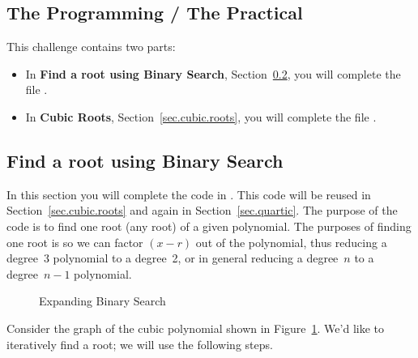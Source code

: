 \subsection{The Programming / The Practical}

This challenge contains two parts:
\begin{itemize}
\item In \textbf{Find a root using Binary Search}, Section~\ref{sec.binary.search}, you will complete the file .
\item In \textbf{Cubic Roots}, Section~\ref{sec.cubic.roots}, you will complete the file .
\end{itemize}

\subsection{Find a root using Binary Search}
\label{sec.binary.search}

In this section you will complete the code in .
This code will be reused in Section~\ref{sec.cubic.roots} and again in
Section~\ref{sec.quartic}.  The purpose of the code is to find one
root (any root) of a given polynomial.  The purposes of finding one
root is so we can factor $(x-r)$ out of the polynomial, thus reducing
a degree~3 polynomial to a degree~2, or in general reducing a degree~$n$ to a degree~$n-1$ polynomial.

\begin{figure}
  \centering

  \caption{Expanding Binary Search} 
  \label{fig.cubic.binary}
\end{figure}

Consider the graph of the cubic polynomial shown in Figure~\ref{fig.cubic.binary}.  We'd like to
iteratively find a root; we will use the following steps.

